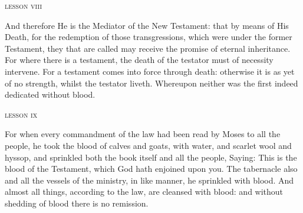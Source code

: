 {\vspace{-9pt}
\begin{center}{\textsc{lesson viii}}\end{center}
\vspace{-5pt}
\begin{parcolumns}[rulebetween,colwidths={1=255pt}]{2}
{And therefore He is the Mediator of the New Testament: that by means of His Death, for the redemption of those transgressions, which were under the former Testament, they that are called may receive the promise of eternal inheritance.
For where there is a testament, the death of the testator must of necessity intervene.
For a testament comes into force through death: otherwise it is as yet of no strength, whilst the testator liveth.
Whereupon neither was the first indeed dedicated without blood.}
\end{parcolumns}

\bigskip\bigskip

\label{resp8_aestimatus_sum}

{
}

\begin{center}{\textsc{lesson ix}}\end{center}

\begin{parcolumns}[rulebetween,colwidths={1=255pt}]{2}
{For when every commandment of the law had been read by Moses to all the people, he took the blood of calves and goats, with water, and scarlet wool and hyssop, and sprinkled both the book itself and all the people,
Saying: This is the blood of the Testament, which God hath enjoined upon you.
The tabernacle also and all the vessels of the ministry, in like manner, he sprinkled with blood.
And almost all things, according to the law, are cleansed with blood: and without shedding of blood there is no remission.}
\end{parcolumns}

}
